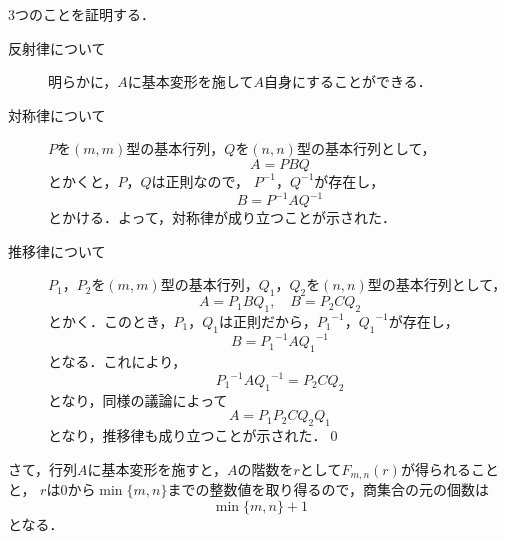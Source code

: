 \documentclass[uplatex,dvipdfmx,a4paper,10pt,fleqn]{jsarticle}
\begin{document}
\begin{tleftbar}
    3つのことを証明する．
    \begin{description}
    \item [反射律について] 明らかに，$A$に基本変形を施して$A$自身にすることができる．
    \item [対称律について] $P$を$(m,m)$型の基本行列，$Q$を$(n,n)$型の基本行列として，
    \[
      A = P B Q
    \]
    とかくと，$P$，$Q$は正則なので， $P^{-1}$，$Q^{-1}$が存在し，
    \[
      B= P^{-1} A Q^{-1}
    \]
    とかける．よって，対称律が成り立つことが示された．
    \item[推移律について] $P_1$，$P_2$を$(m,m)$型の基本行列，$Q_1$，$Q_2$を$(n,n)$型の基本行列として，
    \[
      A = P_1 B Q_1 , \quad B = P_2 C Q_2
    \]
    とかく．このとき，$P_1$，$Q_1$は正則だから，${P_1}^{-1}$，${Q_1}^{-1}$が存在し，
    \[
      B = {P_1}^{-1} A {Q_1}^{-1}
    \]
    となる．これにより，
    \[
      {P_1}^{-1} A {Q_1}^{-1} =P_2 C Q_2
    \]
    となり，同様の議論によって
    \[
      A = P_1 P_2 C Q_2 Q_1
    \]
    となり，推移律も成り立つことが示された．\qed 
  \end{description}
  さて，行列$A$に基本変形を施すと，$A$の階数を$r$として$F_{m,n} (r)$が得られることと，
  $r$は$0$から$\min \{m,n\}$までの整数値を取り得るので，商集合の元の個数は
  \[
    \min \{ m , n \} +1
  \]
  となる．
\end{tleftbar}


\newpage 
\end{document}
